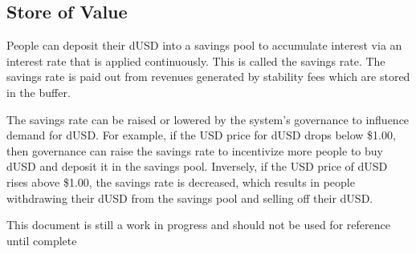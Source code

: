 \documentclass[12pt]{article}
\begin{document}
\subsection{Store of Value}
People can deposit their dUSD into a savings pool to accumulate interest via an interest rate that is applied continuously. This is called the savings rate. The savings rate is paid out from revenues generated by stability fees which are stored in the buffer.

The savings rate can be raised or lowered by the system's governance to influence demand for dUSD. For example, if the USD price for dUSD drops below \$1.00, then governance can raise the savings rate to incentivize more people to buy dUSD and deposit it in the savings pool. Inversely, if the USD price of dUSD rises above \$1.00, the savings rate is decreased, which results in people withdrawing their dUSD from the savings pool and selling off their dUSD.

\color{red} This document is still a work in progress and should not be used for reference until complete
\end{document}
